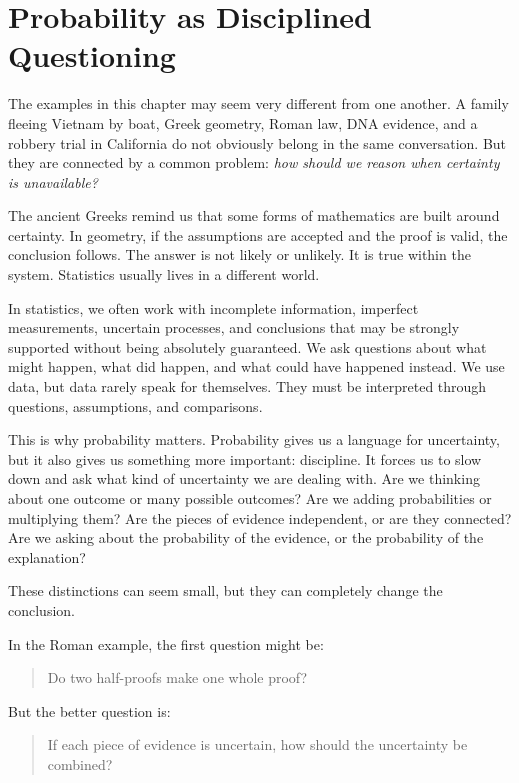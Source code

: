 \documentclass[
  letterpaper,
  DIV=11,
  numbers=noendperiod]{scrreprt}
\begin{document}
\section{Probability as Disciplined
Questioning}\label{probability-as-disciplined-questioning}

The examples in this chapter may seem very different from one another. A
family fleeing Vietnam by boat, Greek geometry, Roman law, DNA evidence,
and a robbery trial in California do not obviously belong in the same
conversation. But they are connected by a common problem: \emph{how
should we reason when certainty is unavailable?}

The ancient Greeks remind us that some forms of mathematics are built
around certainty. In geometry, if the assumptions are accepted and the
proof is valid, the conclusion follows. The answer is not likely or
unlikely. It is true within the system. Statistics usually lives in a
different world.

In statistics, we often work with incomplete information, imperfect
measurements, uncertain processes, and conclusions that may be strongly
supported without being absolutely guaranteed. We ask questions about
what might happen, what did happen, and what could have happened
instead. We use data, but data rarely speak for themselves. They must be
interpreted through questions, assumptions, and comparisons.

This is why probability matters. Probability gives us a language for
uncertainty, but it also gives us something more important: discipline.
It forces us to slow down and ask what kind of uncertainty we are
dealing with. Are we thinking about one outcome or many possible
outcomes? Are we adding probabilities or multiplying them? Are the
pieces of evidence independent, or are they connected? Are we asking
about the probability of the evidence, or the probability of the
explanation?

These distinctions can seem small, but they can completely change the
conclusion.

In the Roman example, the first question might be:

\begin{quote}
Do two half-proofs make one whole proof?
\end{quote}

But the better question is:

\begin{quote}
If each piece of evidence is uncertain, how should the uncertainty be
combined?
\end{quote}
\end{document}

